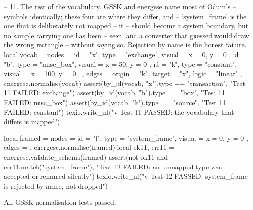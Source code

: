 \documentclass{article}
\begin{document}
\begin{luacode*}
    -- 11. The rest of the vocabulary. GSSK and energese name most of Odum's
    --     symbols identically; these four are where they differ, and
    --     `system_frame' is the one that is deliberately not mapped -- it
    --     should become a system boundary, but no sample carrying one has been
    --     seen, and a converter that guessed would draw the wrong rectangle
    --     without saying so. Rejection by name is the honest failure.
    local vocab = {
        nodes = {
            { id = "x", type = "exchange", visual = { x = 0, y = 0 } },
            { id = "b", type = "misc_box", visual = { x = 50, y = 0 } },
            { id = "k", type = "constant", visual = { x = 100, y = 0 } },
        },
        edges = { { origin = "k", target = "x", logic = "linear" } },
    }
    energese.normalise(vocab)
    assert(by_id(vocab, "x").type == "transaction", "Test 11 FAILED: exchange")
    assert(by_id(vocab, "b").type == "box", "Test 11 FAILED: misc_box")
    assert(by_id(vocab, "k").type == "source", "Test 11 FAILED: constant")
    texio.write_nl("v Test 11 PASSED: the vocabulary that differs is mapped")

    local framed = {
        nodes = { { id = "f", type = "system_frame", visual = { x = 0, y = 0 } } },
        edges = {},
    }
    energese.normalise(framed)
    local ok11, err11 = energese.validate_schema(framed)
    assert(not ok11 and err11:match("system_frame"),
           "Test 12 FAILED: an unmapped type was accepted or renamed silently")
    texio.write_nl("v Test 12 PASSED: system_frame is rejected by name, not dropped")
\end{luacode*}

All GSSK normalisation tests passed.
\end{document}
